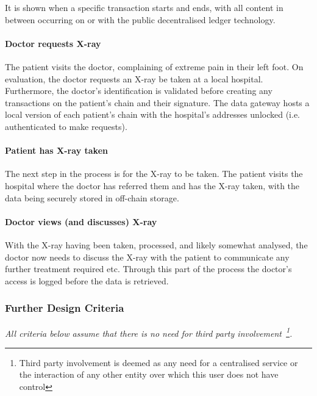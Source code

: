 It is shown when a specific transaction starts and ends, with all content in between occurring on or with the public decentralised ledger technology.

\paragraph{Doctor requests X-ray}

The patient visits the doctor, complaining of extreme pain in their left foot. On evaluation, the doctor requests an X-ray be taken at a local hospital. Furthermore, the doctor's identification is validated before creating any transactions on the patient's chain and their signature. The data gateway hosts a local version of each patient's chain with the hospital's addresses unlocked (i.e. authenticated to make requests).





\paragraph{Patient has X-ray taken}

The next step in the process is for the X-ray to be taken. The patient visits the hospital where the doctor has referred them and has the X-ray taken, with the data being securely stored in off-chain storage.



\paragraph{Doctor views (and discusses) X-ray}

With the X-ray having been taken, processed, and likely somewhat analysed, the doctor now needs to discuss the X-ray with the patient to communicate any further treatment required etc. Through this part of the process the doctor's access is logged before the data is retrieved.



\subsubsection{Further Design Criteria}

\textit{All criteria below assume that there is no need for third party involvement~\footnote{Third party involvement is deemed as any need for a centralised service  or the interaction of any other entity over which this user does not have control}.}

